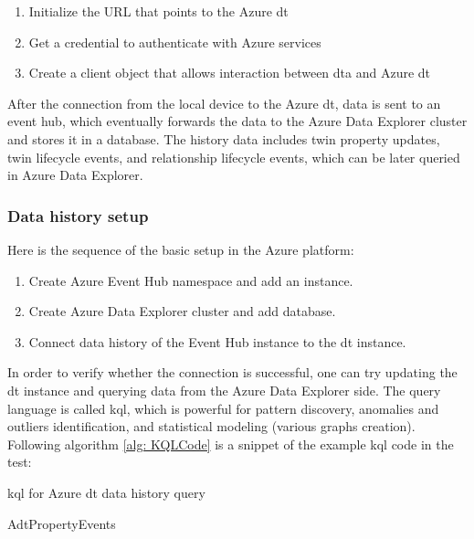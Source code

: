 \begin{enumerate}
    \item Initialize the URL that points to the Azure \gls{dt}
    \item Get a credential to authenticate with Azure services
    \item Create a client object that allows interaction between \gls{dta} and Azure \gls{dt}
    \end{enumerate}

After the connection from the local device to the Azure \gls{dt}, 
data is sent to an event hub, which eventually forwards the data to 
the Azure Data Explorer cluster and stores it in a database. The history data includes 
twin property updates, twin lifecycle events, and relationship lifecycle events, which 
can be later queried in Azure Data Explorer.

\subsubsection{Data history setup}
Here is the sequence of the basic setup in the Azure platform:
\begin{enumerate}
    \item Create Azure Event Hub namespace and add an instance.
    \item Create Azure Data Explorer cluster and add database.
    \item Connect data history of the Event Hub instance to the \gls{dt} instance.
\end{enumerate}

In order to verify whether the connection is successful, one can try updating the 
\gls{dt} instance and querying data from the Azure Data Explorer side. The query
language is called \gls{kql}, which is powerful for pattern discovery, anomalies 
and outliers identification, and statistical modeling (various graphs creation). 
Following algorithm \ref{alg: KQLCode} is a snippet of the example \gls{kql} code in the test: 

\begin{algorithm}
    \caption{\gls{kql} for Azure \gls{dt} data history query}
    \label{alg: KQLCode}
    \begin{algorithmic}
        \State  AdtPropertyEvents 
    \end{algorithmic}
\end{algorithm}


